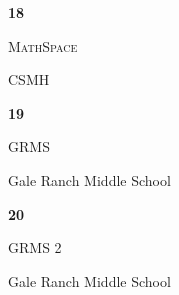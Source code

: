 \documentclass[extrafontsizes,30pt]{memoir}
\begin{document}
\begin{center}
\mbox{}
\vspace{1in}

{\Huge \textbf{ \TeamID}}

\vspace{1in}

{\Large \textsc{\TeamName}}

\vspace{1in}

{\large \SchoolName}
\end{center}

\newpage



\renewcommand{\TeamID}{18}
\renewcommand{\TeamName}{MathSpace}
\renewcommand{\SchoolName}{CSMH}

\begin{center}
\mbox{}
\vspace{1in}

{\Huge \textbf{ \TeamID}}

\vspace{1in}

{\Large \textsc{\TeamName}}

\vspace{1in}

{\large \SchoolName}
\end{center}

\newpage



\renewcommand{\TeamID}{19}
\renewcommand{\TeamName}{GRMS}
\renewcommand{\SchoolName}{Gale Ranch Middle School}

\begin{center}
\mbox{}
\vspace{1in}

{\Huge \textbf{ \TeamID}}

\vspace{1in}

{\Large \textsc{\TeamName}}

\vspace{1in}

{\large \SchoolName}
\end{center}

\newpage



\renewcommand{\TeamID}{20}
\renewcommand{\TeamName}{GRMS 2}
\renewcommand{\SchoolName}{Gale Ranch Middle School}

\begin{center}
\mbox{}
\vspace{1in}

{\Huge \textbf{ \TeamID}}

\vspace{1in}

{\Large \textsc{\TeamName}}

\vspace{1in}

{\large \SchoolName}
\end{center}
\end{document}
